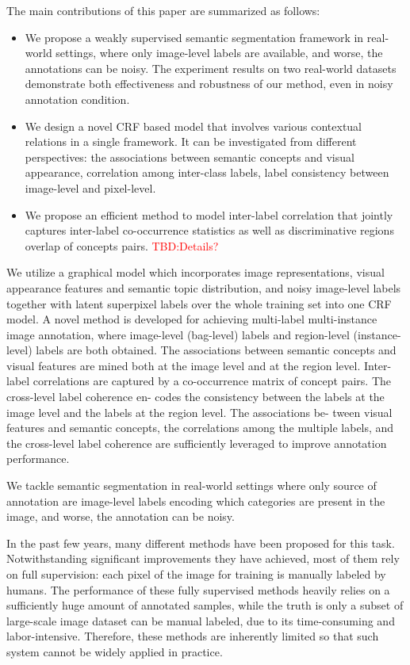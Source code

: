 The main contributions of this paper are summarized as follows:
\begin{itemize}
  \item We propose a weakly supervised semantic segmentation framework in real-world settings, where only image-level labels are available, and worse, the annotations can be noisy. The experiment results on two real-world datasets demonstrate both effectiveness and robustness of our method, even in noisy annotation condition.
  \item We design a novel CRF based model that involves various contextual relations in a single framework. It can be investigated from different perspectives: the associations between semantic concepts and visual appearance, correlation among inter-class labels, label consistency between image-level and pixel-level.
  \item We propose an efficient method to model inter-label correlation that jointly captures inter-label co-occurrence statistics as well as discriminative regions overlap of concepts pairs. {\textcolor{red}{TBD:Details?}}
\end{itemize}

\if

 We utilize a graphical model which incorporates image representations, visual appearance features and semantic topic distribution, and noisy image-level labels together with latent superpixel labels over the whole training set into one CRF model. A novel method is developed for achieving multi-label multi-instance image annotation, where image-level (bag-level) labels and region-level (instance-level) labels are both obtained. The associations between semantic concepts and visual features are mined both at the image level and at the region level. Inter-label correlations are captured by a co-occurrence matrix of concept pairs. The cross-level label coherence en- codes the consistency between the labels at the image level and the labels at the region level. The associations be- tween visual features and semantic concepts, the correlations among the multiple labels, and the cross-level label coherence are sufficiently leveraged to improve annotation performance.

We tackle semantic segmentation in real-world settings where only source of annotation are image-level labels encoding which categories are present in the image, and worse, the annotation can be noisy.

In the past few years, many different methods \cite{csurka2011efficient,gonfaus2010harmony,ladicky2009associative,nowozin2010parameter,shotton2008semantic,shotton2006textonboost,singh2013nonparametric,verbeek2007scene,yang2007multiple,yao2012describing} have been proposed for this task. Notwithstanding significant improvements they have achieved, most of them rely on full supervision: each pixel of the image for training is manually labeled by humans. The performance of these fully supervised methods heavily relies on a sufficiently huge amount of annotated samples, while the truth is only a subset of large-scale image dataset can be manual labeled, due to its time-consuming and labor-intensive. Therefore, these methods are inherently limited so that such system cannot be widely applied in practice.


